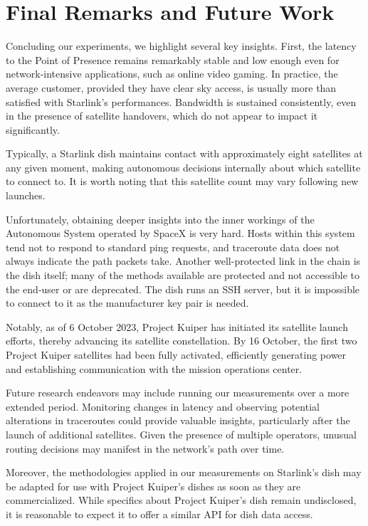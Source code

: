 \documentclass[IN,11pt,twoside,openright,idp,english]{tumthesis}
\begin{document}
\chapter{Final Remarks and Future Work}

Concluding our experiments, we highlight several key insights. First, the latency to the Point of Presence remains remarkably stable and low enough even for network-intensive applications, such as online video gaming. In practice, the average customer, provided they have clear sky access, is usually more than satisfied with Starlink's performances. Bandwidth is sustained consistently, even in the presence of satellite handovers, which do not appear to impact it significantly.

Typically, a Starlink dish maintains contact with approximately eight satellites at any given moment, making autonomous decisions internally about which satellite to connect to. It is worth noting that this satellite count may vary following new launches.

Unfortunately, obtaining deeper insights into the inner workings of the Autonomous System operated by SpaceX is very hard. Hosts within this system tend not to respond to standard ping requests, and traceroute data does not always indicate the path packets take. Another well-protected link in the chain is the dish itself; many of the methods available are protected and not accessible to the end-user or are deprecated. The dish runs an SSH server, but it is impossible to connect to it as the manufacturer key pair is needed.

Notably, as of 6 October 2023, Project Kuiper has initiated its satellite launch efforts, thereby advancing its satellite constellation. By 16 October, the first two Project Kuiper satellites had been fully activated, efficiently generating power and establishing communication with the mission operations center.

Future research endeavors may include running our measurements over a more extended period. Monitoring changes in latency and observing potential alterations in traceroutes could provide valuable insights, particularly after the launch of additional satellites. Given the presence of multiple operators, unusual routing decisions may manifest in the network's path over time.

Moreover, the methodologies applied in our measurements on Starlink's dish may be adapted for use with Project Kuiper's dishes as soon as they are commercialized. While specifics about Project Kuiper's dish remain undisclosed, it is reasonable to expect it to offer a similar API for dish data access.
\end{document}
